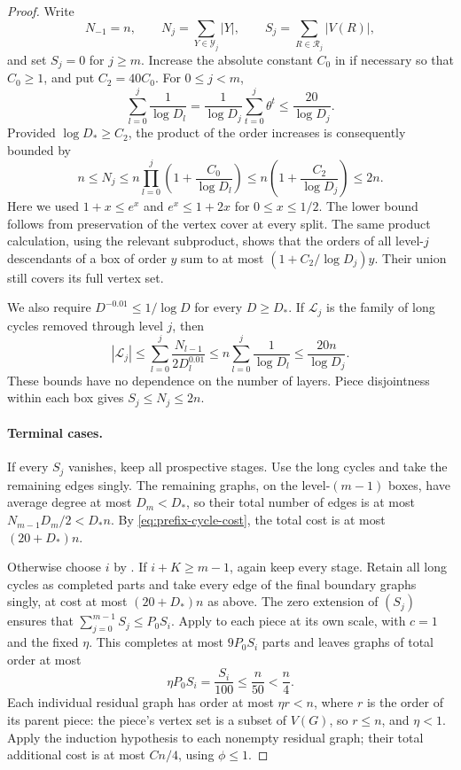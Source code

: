 \begin{proof}
Write
\[
 N_{-1}=n,\qquad N_j=\sum_{Y\in\mathcal Y_j}|Y|,
 \qquad S_j=\sum_{R\in\mathcal R_j}|V(R)|,
\]
and set \(S_j=0\) for \(j\ge m\). Increase the absolute
constant \(C_0\) in  if necessary so that
\(C_0\ge1\), and put \(C_2=40C_0\). For \(0\le j<m\),
\[
 \sum_{l=0}^j\frac1{\log D_l}
 =\frac1{\log D_j}\sum_{t=0}^j\theta^t
 \le\frac{20}{\log D_j}.
\]
Provided \(\log D_*\ge C_2\), the product of the order
increases is consequently bounded by
\begin{equation}\label{eq:layer-order}
 n\le N_j
 \le n\prod_{l=0}^j\left(1+\frac{C_0}{\log D_l}\right)
 \le n\left(1+\frac{C_2}{\log D_j}\right)
 \le2n.
\end{equation}
Here we used \(1+x\le e^x\) and \(e^x\le1+2x\) for
\(0\le x\le1/2\). The lower bound follows from preservation
of the vertex cover at every split. The same product calculation,
using the relevant subproduct, shows that the orders of all
level-\(j\) descendants of a box of order \(y\) sum to at most
\((1+C_2/\log D_j)y\). Their union still covers its full
vertex set.

We also require \(D^{-0.01}\le1/\log D\) for every
\(D\ge D_*\). If \(\mathcal L_j\) is the family of long
cycles removed through level \(j\), then
\begin{equation}\label{eq:prefix-cycle-cost}
 |\mathcal L_j|
 \le\sum_{l=0}^j\frac{N_{l-1}}{2D_l^{0.01}}
 \le n\sum_{l=0}^j\frac1{\log D_l}
 \le\frac{20n}{\log D_j}.
\end{equation}
These bounds have no dependence on the number of layers.
Piece disjointness within each box gives
\(S_j\le N_j\le2n\).

\paragraph{Terminal cases.}
If every \(S_j\) vanishes, keep all prospective stages. Use the
long cycles and take the remaining edges singly. The remaining
graphs, on the level-\((m-1)\) boxes, have average degree at most
\(D_m<D_*\), so their total number of edges is at most
\(N_{m-1}D_m/2<D_*n\). By
\eqref{eq:prefix-cycle-cost}, the total cost is at most
\((20+D_*)n\).

Otherwise choose \(i\) by . If
\(i+K\ge m-1\), again keep every stage. Retain all long cycles as
completed parts and take every edge of the final boundary graphs
singly, at cost at most \((20+D_*)n\) as above. The zero extension of
\((S_j)\) ensures that
\(\sum_{j=0}^{m-1}S_j\le P_0S_i\). Apply
 to each piece at its own scale, with
\(c=1\) and the fixed \(\eta\). This completes at most
\(9P_0S_i\) parts and leaves graphs of total order at most
\[
 \eta P_0S_i=\frac{S_i}{100}\le\frac n{50}<\frac n4.
\]
Each individual residual graph has order at most \(\eta r<n\),
where \(r\) is the order of its parent piece: the piece's
vertex set is a subset of \(V(G)\), so \(r\le n\), and
\(\eta<1\). Apply the induction hypothesis to each nonempty
residual graph; their total additional cost is at most \(Cn/4\),
using \(\phi\le1\).


\end{proof}
